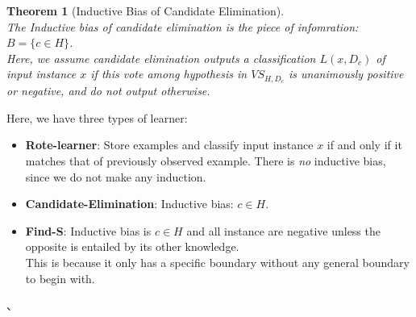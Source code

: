 \documentclass[12pt]{article}
\newtheorem{theorem}{Theorem}[section]
\theoremstyle{definition}
\begin{document}
\begin{theorem}[Inductive Bias of Candidate Elimination]
\hfill\\\normalfont The Inductive bias of candidate elimination is the piece of infomration: $B=\{c\in H\}$.\\
Here, we assume candidate elimination outputs a classification $L(x, D_c)$ of input instance $x$ if this vote among hypothesis in $VS_{H, D_c}$ is unanimously positive or negative, and do not output otherwise.
\end{theorem}
Here, we have three types of learner:
\begin{itemize}
	\item \textbf{Rote-learner}: Store examples and classify input instance $x$ if and only if it matches that of previously observed example. There is \textit{no} inductive bias, since we do not make any induction.
	\item \textbf{Candidate-Elimination}: Inductive bias: $c\in H$.
	\item \textbf{Find-S}: Inductive bias is $c\in H$ and all instance are negative unless the opposite is entailed by its other knowledge.\\
	This is because it only has a specific boundary without any general boundary to begin with.
\end{itemize}、
\end{document}
